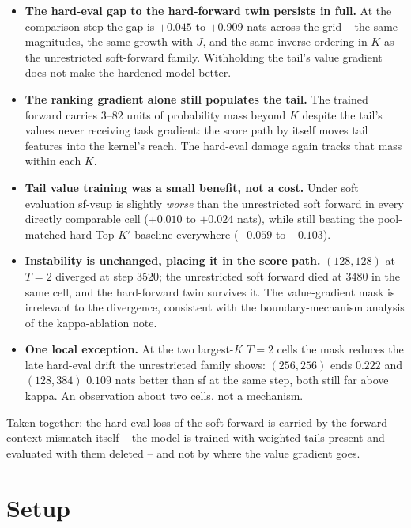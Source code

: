 \documentclass[11pt,a4paper]{article}
\newcommand{\Kp}{K'}
\begin{document}
\begin{itemize}[leftmargin=1.4em]
\item \textbf{The hard-eval gap to the hard-forward twin persists in full.}
At the comparison step the gap is $+0.045$ to $+0.909$ nats across the grid --
the same magnitudes, the same growth with $J$, and the same inverse ordering
in $K$ as the unrestricted soft-forward family. Withholding the tail's value
gradient does not make the hardened model better.

\item \textbf{The ranking gradient alone still populates the tail.} The
trained forward carries $3$--$82$ units of probability mass beyond $K$
despite the tail's values never receiving task gradient: the score path by
itself moves tail features into the kernel's reach. The hard-eval damage
again tracks that mass within each $K$.

\item \textbf{Tail value training was a small benefit, not a cost.} Under
soft evaluation sf-vsup is slightly \emph{worse} than the unrestricted soft
forward in every directly comparable cell ($+0.010$ to $+0.024$ nats), while
still beating the pool-matched hard Top-$\Kp$ baseline everywhere
($-0.059$ to $-0.103$).

\item \textbf{Instability is unchanged, placing it in the score path.}
$(128,128)$ at $T=2$ diverged at step 3520; the unrestricted soft forward
died at 3480 in the same cell, and the hard-forward twin survives it. The
value-gradient mask is irrelevant to the divergence, consistent with the
boundary-mechanism analysis of the kappa-ablation note.

\item \textbf{One local exception.} At the two largest-$K$ $T=2$ cells the
mask reduces the late hard-eval drift the unrestricted family shows:
$(256,256)$ ends $0.222$ and $(128,384)$ $0.109$ nats better than sf at the
same step, both still far above kappa. An observation about two cells, not a
mechanism.
\end{itemize}

Taken together: the hard-eval loss of the soft forward is carried by the
forward-context mismatch itself -- the model is trained with weighted tails
present and evaluated with them deleted -- and not by where the value
gradient goes.

\section{Setup}
\end{document}
